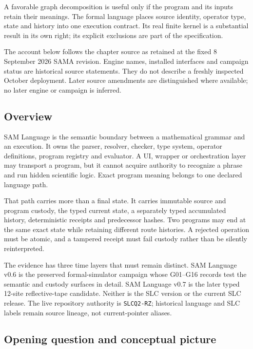 \label{viii-ch02-sam-language-and-exact-program-semantics}

A favorable graph decomposition is useful only if the program and its
inputs retain their meanings. The formal language places source
identity, operator type, state and history into one execution contract.
Its real finite kernel is a substantial result in its own right; its
explicit exclusions are part of the specification.

The account below follows the chapter source as retained at the fixed 8
September 2026 SAMA revision. Engine names, installed interfaces and
campaign status are historical source statements. They do not describe a
freshly inspected October deployment. Later source amendments are
distinguished where available; no later engine or campaign is inferred.

\subsection{Overview}\label{viii-ch02-overview}

SAM Language is the semantic boundary between a mathematical grammar and
an execution. It owns the parser, resolver, checker, type system,
operator definitions, program registry and evaluator. A UI, wrapper or
orchestration layer may transport a program, but it cannot acquire
authority to recognize a phrase and run hidden scientific logic. Exact
program meaning belongs to one declared language path.

That path carries more than a final state. It carries immutable source
and program custody, the typed current state, a separately typed
accumulated history, deterministic receipts and predecessor hashes. Two
programs may end at the same exact state while retaining different route
histories. A rejected operation must be atomic, and a tampered receipt
must fail custody rather than be silently reinterpreted.

The evidence has three time layers that must remain distinct. SAM
Language v0.6 is the preserved formal-simulator campaign whose G01--G16
records test the semantic and custody surfaces in detail. SAM Language
v0.7 is the later typed 12-site reflective-tape candidate. Neither is
the SLC version or the current SLC release. The live repository
authority is \texttt{SLCQ2-RZ}; historical language and SLC labels
remain source lineage, not current-pointer aliases.

\subsection{Opening question and conceptual
picture}\label{viii-ch02-opening-question-and-conceptual-picture}

